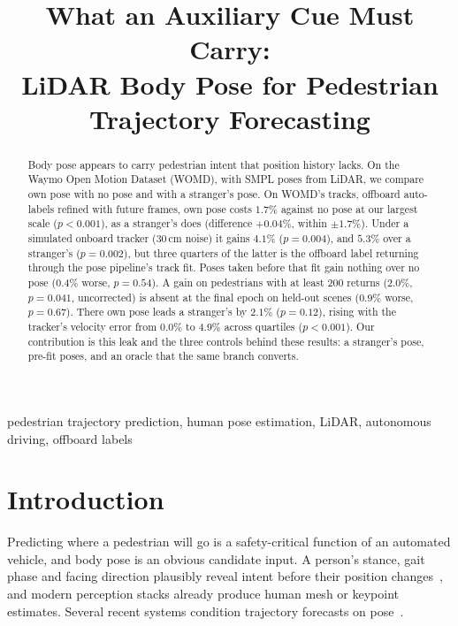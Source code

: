 \documentclass[conference]{IEEEtran}
\begin{document}

\title{What an Auxiliary Cue Must Carry:\\
LiDAR Body Pose for Pedestrian\\
Trajectory Forecasting}

\author{
}

\maketitle

\begin{abstract}
Body pose appears to carry pedestrian intent that position history lacks. On
the Waymo Open Motion Dataset (WOMD), with SMPL poses from LiDAR, we compare
own pose with no pose and with a stranger's pose. On
WOMD's tracks, offboard auto-labels refined with future frames, own pose costs
$1.7\%$ against no pose at our largest scale ($p{<}0.001$), as a stranger's
does (difference $+0.04\%$, within $\pm1.7\%$). Under a simulated onboard
tracker ($30$\,cm noise) it gains $4.1\%$ ($p{=}0.004$), and $5.3\%$ over a
stranger's ($p{=}0.002$), but three quarters of the latter is the offboard
label returning through the pose pipeline's track fit. Poses taken before
that fit gain nothing over no pose ($0.4\%$ worse, $p{=}0.54$). A gain
on pedestrians with at least $200$ returns ($2.0\%$,
$p{=}0.041$, uncorrected) is absent at the final epoch on held-out scenes
($0.9\%$ worse, $p{=}0.67$). There own pose leads a stranger's by $2.1\%$
($p{=}0.12$), rising with the tracker's velocity error from $0.0\%$ to $4.9\%$
across quartiles ($p{<}0.001$). Our contribution is this leak and the three
controls behind these results: a stranger's pose, pre-fit poses, and an oracle
that the same branch converts.
\end{abstract}

\begin{IEEEkeywords}
pedestrian trajectory prediction, human pose estimation, LiDAR, autonomous driving, offboard labels
\end{IEEEkeywords}

\section{Introduction}
Predicting where a pedestrian will go is a safety-critical function of an
automated vehicle, and body pose is an obvious candidate input. A person's stance,
gait phase and facing direction plausibly reveal intent before their position
changes~\cite{kooij2014context,flohr2015orientation}, and modern perception stacks already produce human mesh or keypoint
estimates. Several recent systems condition trajectory forecasts on
pose~\cite{saadatnejad2024socialtransmotion,gao2025socialpose,salzmann2023robots,kress2022pose}.
\end{document}
